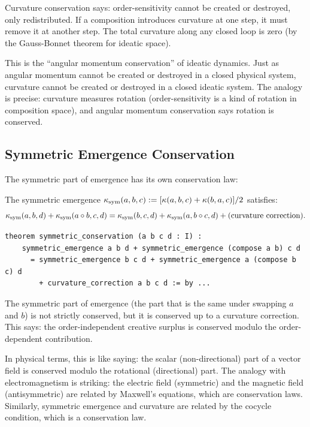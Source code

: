 \begin{interpretation}
Curvature conservation says: order-sensitivity cannot be created or destroyed,
only redistributed. If a composition introduces curvature at one step, it must
remove it at another step. The total curvature along any closed loop is zero
(by the Gauss-Bonnet theorem for ideatic space).

This is the ``angular momentum conservation'' of ideatic dynamics. Just as
angular momentum cannot be created or destroyed in a closed physical system,
curvature cannot be created or destroyed in a closed ideatic system. The
analogy is precise: curvature measures rotation (order-sensitivity is a kind
of rotation in composition space), and angular momentum conservation says
rotation is conserved.
\end{interpretation}

\subsection{Symmetric Emergence Conservation}

The symmetric part of emergence has its own conservation law:

\begin{theorem}
\label{thm:symmetric-conservation}
The symmetric emergence $\kappa_{\text{sym}}(a, b, c) := [\kappa(a,b,c) +
\kappa(b,a,c)]/2$ satisfies:
\[
  \kappa_{\text{sym}}(a, b, d) + \kappa_{\text{sym}}(a \circ b, c, d)
  = \kappa_{\text{sym}}(b, c, d) + \kappa_{\text{sym}}(a, b \circ c, d)
    + \text{(curvature correction)}.
\]
\end{theorem}

\begin{lstlisting}[caption={Symmetric conservation (IDT\_v3\_Emergence.lean)}]
theorem symmetric_conservation (a b c d : I) :
    symmetric_emergence a b d + symmetric_emergence (compose a b) c d
      = symmetric_emergence b c d + symmetric_emergence a (compose b c) d
        + curvature_correction a b c d := by ...
\end{lstlisting}

\begin{interpretation}
The symmetric part of emergence (the part that is the same under swapping $a$
and $b$) is not strictly conserved, but it is conserved up to a curvature
correction. This says: the order-independent creative surplus is conserved
modulo the order-dependent contribution.

In physical terms, this is like saying: the scalar (non-directional) part of
a vector field is conserved modulo the rotational (directional) part. The
analogy with electromagnetism is striking: the electric field (symmetric) and
the magnetic field (antisymmetric) are related by Maxwell's equations, which
are conservation laws. Similarly, symmetric emergence and curvature are
related by the cocycle condition, which is a conservation law.
\end{interpretation}

